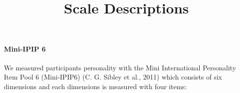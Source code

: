 \documentclass[
  letterpaper,
  DIV=11,
  numbers=noendperiod]{scrartcl}
\title{Scale Descriptions}
\author{}
\date{}
\let\oldparagraph\paragraph
\renewcommand{\paragraph}[1]{\oldparagraph{#1}\mbox{}}
\begin{document}
\maketitle
\ifdefined\Shaded\renewenvironment{Shaded}{\begin{tcolorbox}[borderline west={3pt}{0pt}{shadecolor}, enhanced, sharp corners, interior hidden, breakable, boxrule=0pt, frame hidden]}{\end{tcolorbox}}\fi

\hypertarget{mini-ipip-6}{%
\paragraph{Mini-IPIP 6}\label{mini-ipip-6}}

We measured participants personality with the Mini International
Personality Item Pool 6 (Mini-IPIP6) (C. G. Sibley et al., 2011) which
consists of six dimensions and each dimensions is measured with four
items:
\end{document}
